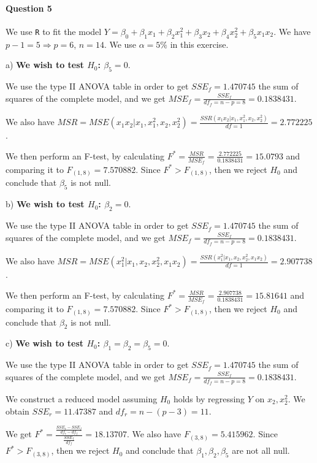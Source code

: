 \documentclass[]{article}
\let\oldparagraph\paragraph
\renewcommand{\paragraph}[1]{\oldparagraph{#1}\mbox{}}
\begin{document}
\paragraph{\Large Question 5}\normalsize

We use \texttt{R} to fit the model $Y = \beta_0 + \beta_1 x_1 + \beta_2 x_1^2 + \beta_3 x_2 + \beta_4 x_2^2 + \beta_5 x_1x_2$. We have $p-1 = 5 \Rightarrow p = 6$, $n = 14$. We use $\alpha = 5\%$ in this exercise.

a) \textbf{We wish to test $H_0$: $\beta_5 = 0$}. 

We use the type II ANOVA table in order to get $SSE_f = 1.470745$ the sum of squares of the complete model, and we get $MSE_f = \frac{SSE_f}{df_f = n-p = 8} = 0.1838431$.

We also have $MSR = MSE(x_1 x_2 | x_1, x_1^2, x_2, x_2^2) = \frac{SSR(x_1 x_2 | x_1, x_1^2, x_2, x_2^2)}{df = 1} = 2.772225$.

We then perform an F-test, by calculating $F^* = \frac{MSR}{MSE_f} = \frac{2.772225}{0.1838431} = 15.0793$ and comparing it to $F_{(1, 8)} = 7.570882$. Since $F^* > F_{(1, 8)}$, then we reject $H_0$ and conclude that $\beta_5$ is not null.

b) \textbf{We wish to test $H_0$: $\beta_2 = 0$}.

We use the type II ANOVA table in order to get $SSE_f = 1.470745$ the sum of squares of the complete model, and we get $MSE_f = \frac{SSE_f}{df_f = n-p = 8} = 0.1838431$.

We also have $MSR = MSE(x_1^2 | x_1, x_2, x_2^2, x_1 x_2) = \frac{SSR(x_1^2 | x_1, x_2, x_2^2, x_1 x_2)}{df = 1} = 2.907738$.

We then perform an F-test, by calculating $F^* = \frac{MSR}{MSE_f} = \frac{2.907738}{0.1838431} = 15.81641$ and comparing it to $F_{(1, 8)} = 7.570882$. Since $F^* > F_{(1, 8)}$, then we reject $H_0$ and conclude that $\beta_2$ is not null.

c) \textbf{We wish to test $H_0$: $\beta_1 = \beta_2 = \beta_5 = 0$}.

We use the type II ANOVA table in order to get $SSE_f = 1.470745$ the sum of squares of the complete model, and we get $MSE_f = \frac{SSE_f}{df_f = n-p = 8} = 0.1838431$.

We construct a reduced model assuming $H_0$ holds by regressing $Y$ on $x_2, x_2^2$. We obtain $SSE_r = 11.47387$ and $df_r = n-(p-3) = 11$.

We get $F^* = \frac{\frac{SSE_r - SSE_f}{df_r - df_f}}{\frac{SSE_f}{df_f}} = 18.13707$. We also have $F_{(3, 8)} = 5.415962$. Since $F^* > F_{(3, 8)}$, then we reject $H_0$ and conclude that $\beta_1, \beta_2, \beta_5$ are not all null.
\end{document}
